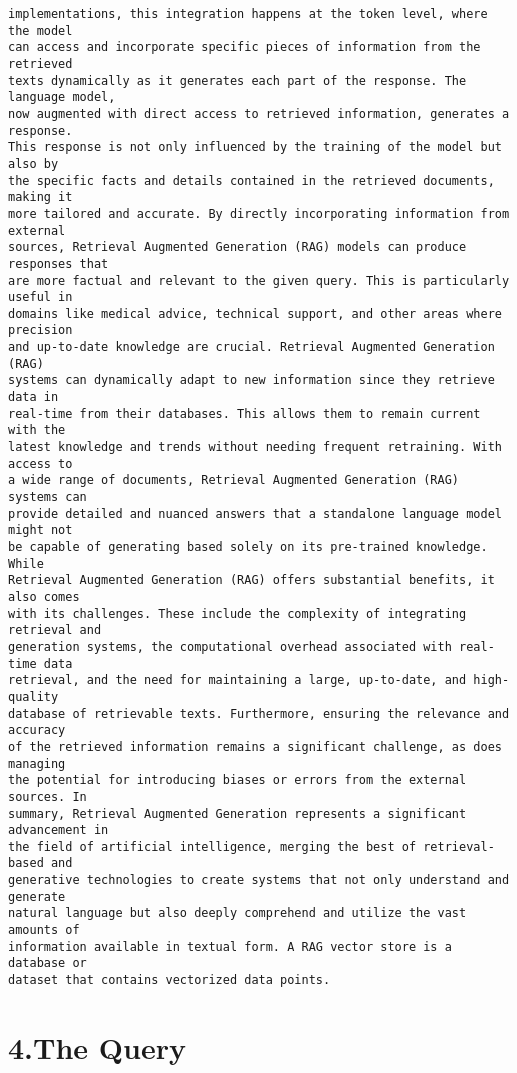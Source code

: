 \documentclass[11pt]{article}
\begin{document}
\begin{Verbatim}[commandchars=\\\{\}]
implementations, this integration happens at the token level, where the model
can access and incorporate specific pieces of information from the retrieved
texts dynamically as it generates each part of the response. The language model,
now augmented with direct access to retrieved information, generates a response.
This response is not only influenced by the training of the model but also by
the specific facts and details contained in the retrieved documents, making it
more tailored and accurate. By directly incorporating information from external
sources, Retrieval Augmented Generation (RAG) models can produce responses that
are more factual and relevant to the given query. This is particularly useful in
domains like medical advice, technical support, and other areas where precision
and up-to-date knowledge are crucial. Retrieval Augmented Generation (RAG)
systems can dynamically adapt to new information since they retrieve data in
real-time from their databases. This allows them to remain current with the
latest knowledge and trends without needing frequent retraining. With access to
a wide range of documents, Retrieval Augmented Generation (RAG) systems can
provide detailed and nuanced answers that a standalone language model might not
be capable of generating based solely on its pre-trained knowledge. While
Retrieval Augmented Generation (RAG) offers substantial benefits, it also comes
with its challenges. These include the complexity of integrating retrieval and
generation systems, the computational overhead associated with real-time data
retrieval, and the need for maintaining a large, up-to-date, and high-quality
database of retrievable texts. Furthermore, ensuring the relevance and accuracy
of the retrieved information remains a significant challenge, as does managing
the potential for introducing biases or errors from the external sources. In
summary, Retrieval Augmented Generation represents a significant advancement in
the field of artificial intelligence, merging the best of retrieval-based and
generative technologies to create systems that not only understand and generate
natural language but also deeply comprehend and utilize the vast amounts of
information available in textual form. A RAG vector store is a database or
dataset that contains vectorized data points.
    \end{Verbatim}

    \section{4.The Query}\label{the-query}
\end{document}
